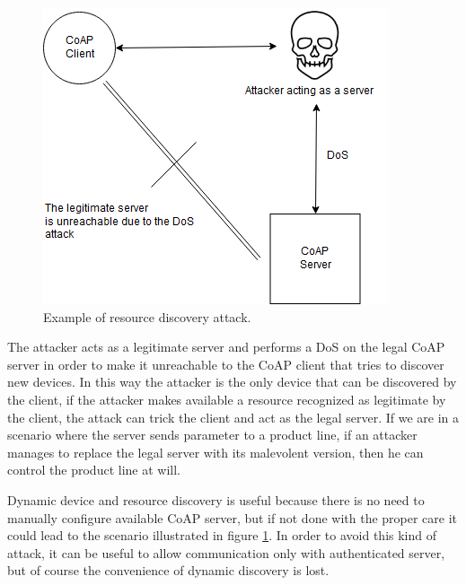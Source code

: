 	\begin{figure}
		\includegraphics[width=\linewidth]{coap-vuln-img5.png}
		\caption{Example of resource discovery attack.}
		\label{fig:coap-vuln5}
	\end{figure}
	
	The attacker acts as a legitimate server and performs a DoS on the legal CoAP server in order to make it unreachable to the CoAP client that tries to discover new devices.\newline
	In this way the attacker is the only device that can be discovered by the client, if the attacker makes available a resource recognized as legitimate by the client, the attack can trick the client and act as the legal server.\newline
	If we are in a scenario where the server sends parameter to a product line, if an attacker manages to replace the legal server with its malevolent version, then he can control the product line at will.\newline
	
	Dynamic device and resource discovery is useful because there is no need to manually configure available CoAP server, but if not done with the proper care it could lead to the scenario illustrated in figure \ref{fig:coap-vuln5}.
	In order to avoid this kind of attack, it can be useful to allow communication only with authenticated server, but of course the convenience of dynamic discovery is lost.\newline
		
